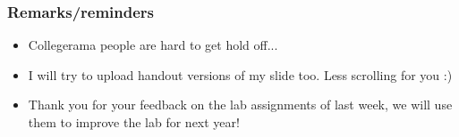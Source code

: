 

\begin{frame}
	\frametitle{Remarks/reminders}
	\begin{itemize}
		\item Collegerama people are hard to get hold off...
			\pause
		\item I will try to upload handout versions of my slide too. Less scrolling for you :)
			\pause
		\item Thank you for your feedback on the lab assignments of last week, we will use them to improve the lab for next
			year!
	\end{itemize}
	
\end{frame}
